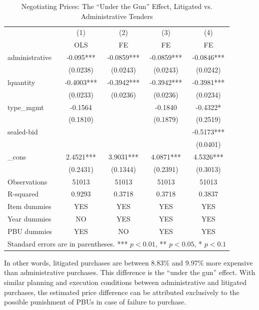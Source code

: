 \begin{table}[ht]
  \centering
  \caption{Negotiating Prices: The “Under the Gun” Effect, Litigated vs. Administrative Tenders}
  \begin{tabular}{lcccc}
    \hline
                 & (1)        & (2)        & (3)        & (4)        \\
                 & OLS       & FE         & FE         & FE         \\
    \hline
    administrative   & -0.095*** & -0.0859*** & -0.0859*** & -0.0846*** \\
                     & (0.0238)  & (0.0243)   & (0.0243)   & (0.0242)   \\
    lquantity        & -0.4003*** & -0.3942*** & -0.3942*** & -0.3981*** \\
                     & (0.0233)   & (0.0236)   & (0.0236)   & (0.0234)   \\
    type\_mgmt       & -0.1564   &           & -0.1840    & -0.4322*   \\
                     & (0.1810)  &           & (0.1879)   & (0.2519)   \\
    sealed-bid       &           &           &           & -0.5173*** \\
                     &           &           &           & (0.0401)   \\
    \_cons           & 2.4521*** & 3.9031*** & 4.0871*** & 4.5326*** \\
                     & (0.2431)  & (0.1344)   & (0.2391)   & (0.3013)   \\
    Observations     & 51013     & 51013     & 51013     & 51013     \\
    R-squared        & 0.9293    & 0.3718    & 0.3718    & 0.3837    \\
    Item dummies     & YES       & YES       & YES       & YES       \\
    Year dummies     & NO        & YES       & YES       & YES       \\
    PBU dummies      & YES       & NO        & YES       & YES       \\
    \hline
    \multicolumn{5}{l}{\footnotesize Standard errors are in parentheses. *** $p<0.01$, ** $p<0.05$, * $p<0.1$}
  \end{tabular}
\end{table}

In other words, litigated purchases are between 8.83\% and 9.97\% more expensive than administrative purchases. This difference is the “under the gun” effect. With similar planning and execution conditions between administrative and litigated purchases, the estimated price difference can be attributed exclusively to the possible punishment of PBUs in case of failure to purchase.
